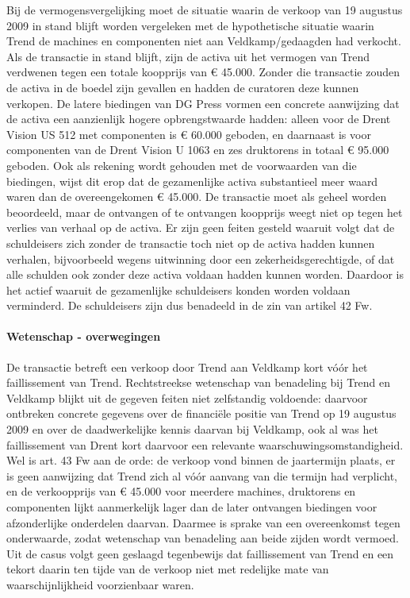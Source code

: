 \documentclass[
  dutch,
  a4paper,
]{article}
\begin{document}
Bij de vermogensvergelijking moet de situatie waarin de verkoop van 19 augustus 2009 in stand blijft worden vergeleken met de hypothetische situatie waarin Trend de machines en componenten niet aan Veldkamp/gedaagden had verkocht. Als de transactie in stand blijft, zijn de activa uit het vermogen van Trend verdwenen tegen een totale koopprijs van € 45.000. Zonder die transactie zouden de activa in de boedel zijn gevallen en hadden de curatoren deze kunnen verkopen. De latere biedingen van DG Press vormen een concrete aanwijzing dat de activa een aanzienlijk hogere opbrengstwaarde hadden: alleen voor de Drent Vision US 512 met componenten is € 60.000 geboden, en daarnaast is voor componenten van de Drent Vision U 1063 en zes druktorens in totaal € 95.000 geboden. Ook als rekening wordt gehouden met de voorwaarden van die biedingen, wijst dit erop dat de gezamenlijke activa substantieel meer waard waren dan de overeengekomen € 45.000. De transactie moet als geheel worden beoordeeld, maar de ontvangen of te ontvangen koopprijs weegt niet op tegen het verlies van verhaal op de activa. Er zijn geen feiten gesteld waaruit volgt dat de schuldeisers zich zonder de transactie toch niet op de activa hadden kunnen verhalen, bijvoorbeeld wegens uitwinning door een zekerheidsgerechtigde, of dat alle schulden ook zonder deze activa voldaan hadden kunnen worden. Daardoor is het actief waaruit de gezamenlijke schuldeisers konden worden voldaan verminderd. De schuldeisers zijn dus benadeeld in de zin van artikel 42 Fw.

\paragraph{Wetenschap - overwegingen}\label{wetenschap---overwegingen-64}

De transactie betreft een verkoop door Trend aan Veldkamp kort vóór het faillissement van Trend. Rechtstreekse wetenschap van benadeling bij Trend en Veldkamp blijkt uit de gegeven feiten niet zelfstandig voldoende: daarvoor ontbreken concrete gegevens over de financiële positie van Trend op 19 augustus 2009 en over de daadwerkelijke kennis daarvan bij Veldkamp, ook al was het faillissement van Drent kort daarvoor een relevante waarschuwingsomstandigheid. Wel is art. 43 Fw aan de orde: de verkoop vond binnen de jaartermijn plaats, er is geen aanwijzing dat Trend zich al vóór aanvang van die termijn had verplicht, en de verkoopprijs van € 45.000 voor meerdere machines, druktorens en componenten lijkt aanmerkelijk lager dan de later ontvangen biedingen voor afzonderlijke onderdelen daarvan. Daarmee is sprake van een overeenkomst tegen onderwaarde, zodat wetenschap van benadeling aan beide zijden wordt vermoed. Uit de casus volgt geen geslaagd tegenbewijs dat faillissement van Trend en een tekort daarin ten tijde van de verkoop niet met redelijke mate van waarschijnlijkheid voorzienbaar waren.
\end{document}
